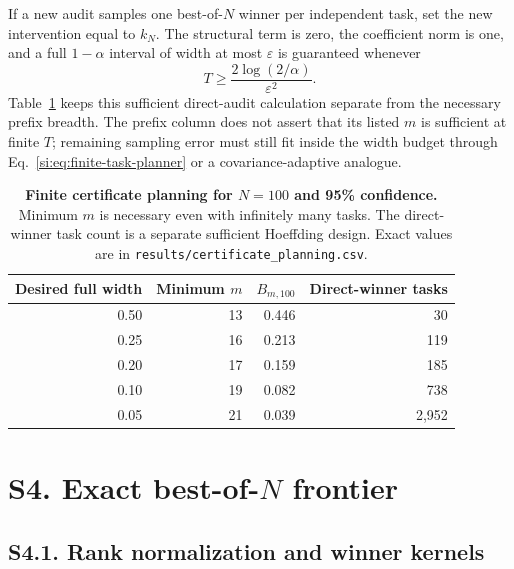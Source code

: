 If a new audit samples one best-of-$N$ winner per independent task, set the new intervention equal to $k_N$. The structural term is zero, the coefficient norm is one, and a full $1-\alpha$ interval of width at most $\varepsilon$ is guaranteed whenever
\begin{equation}
T\ge\frac{2\log(2/\alpha)}{\varepsilon^2}.
\label{si:eq:direct-task-count}
\end{equation}
Table~\ref{si:tab:certificate-planner} keeps this sufficient direct-audit calculation separate from the necessary prefix breadth. The prefix column does not assert that its listed $m$ is sufficient at finite $T$; remaining sampling error must still fit inside the width budget through Eq.~\ref{si:eq:finite-task-planner} or a covariance-adaptive analogue.

\begin{table}[h]
\centering
\caption{\textbf{Finite certificate planning for $N=100$ and 95\% confidence.} Minimum $m$ is necessary even with infinitely many tasks. The direct-winner task count is a separate sufficient Hoeffding design. Exact values are in \texttt{results/certificate\_planning.csv}.}
\label{si:tab:certificate-planner}
\begin{tabular}{rrrr}
\toprule
Desired full width & Minimum $m$ & $B_{m,100}$ & Direct-winner tasks \\
\midrule
0.50 & 13 & 0.446 & 30 \\
0.25 & 16 & 0.213 & 119 \\
0.20 & 17 & 0.159 & 185 \\
0.10 & 19 & 0.082 & 738 \\
0.05 & 21 & 0.039 & 2,952 \\
\bottomrule
\end{tabular}
\end{table}

\section*{S4. Exact best-of-$N$ frontier}

\subsection*{S4.1. Rank normalization and winner kernels}

